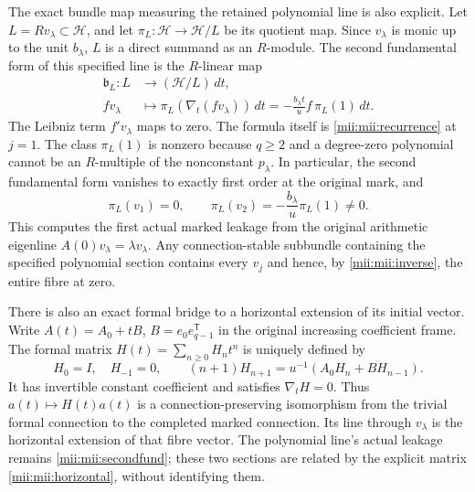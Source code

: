 \documentclass[11pt,a4paper]{article}
\begin{document}
The exact bundle map measuring the retained polynomial line is
also explicit. Let $L=R v_\lambda\subset\mathscr H$, and let
$\pi_L:\mathscr H\to\mathscr H/L$ be its quotient map. Since
$v_\lambda$ is monic up to the unit $b_\lambda$, $L$ is a direct
summand as an $R$-module. The second fundamental form of this
specified line is the $R$-linear map
\begin{equation}\tag{MII23}\label{mii:mii:secondfund}
 \begin{aligned}
 \mathfrak b_L:L&\longrightarrow(\mathscr H/L)\,dt,\\
 f v_\lambda&\longmapsto
       \pi_L(\nabla_t(fv_\lambda))\,dt
       =-\frac{b_\lambda t}{u}f\,\pi_L(1)\,dt.
 \end{aligned}
\end{equation}
The Leibniz term $f'v_\lambda$ maps to zero. The formula itself
is \eqref{mii:mii:recurrence} at $j=1$. The class $\pi_L(1)$ is
nonzero because $q\ge2$ and a degree-zero polynomial cannot be
an $R$-multiple of the nonconstant $p_\lambda$. In particular,
the second fundamental form vanishes to exactly first order
at the original mark, and
\begin{equation}\tag{MII24}\label{mii:mii:secondjet}
 \pi_L(v_1)=0,\qquad
 \pi_L(v_2)=-\frac{b_\lambda}{u}\pi_L(1)\ne0.
\end{equation}
This computes the first actual marked leakage from the original
arithmetic eigenline $A(0)v_\lambda=\lambda v_\lambda$.
Any connection-stable subbundle containing the specified
polynomial section contains every $v_j$ and hence, by
\eqref{mii:mii:inverse}, the entire fibre at zero.

There is also an exact formal bridge to a horizontal extension
of its initial vector. Write
$A(t)=A_0+tB$, $B=e_0e_{q-1}^{\mathsf T}$ in the original
increasing coefficient frame. The formal matrix
$H(t)=\sum_{n\ge0}H_nt^n$ is uniquely defined by
\begin{equation}\tag{MII25}\label{mii:mii:horizontal}
 H_0=I,\quad H_{-1}=0,\qquad
 (n+1)H_{n+1}=u^{-1}(A_0H_n+B H_{n-1}).
\end{equation}
It has invertible constant coefficient and satisfies
$\nabla_t H=0$. Thus $a(t)\mapsto H(t)a(t)$ is a
connection-preserving isomorphism from the trivial formal
connection to the completed marked connection. Its line through
$v_\lambda$ is the horizontal extension of that fibre vector.
The polynomial line's actual leakage remains
\eqref{mii:mii:secondfund}; these two sections are related by the
explicit matrix \eqref{mii:mii:horizontal}, without identifying them.
\end{document}
